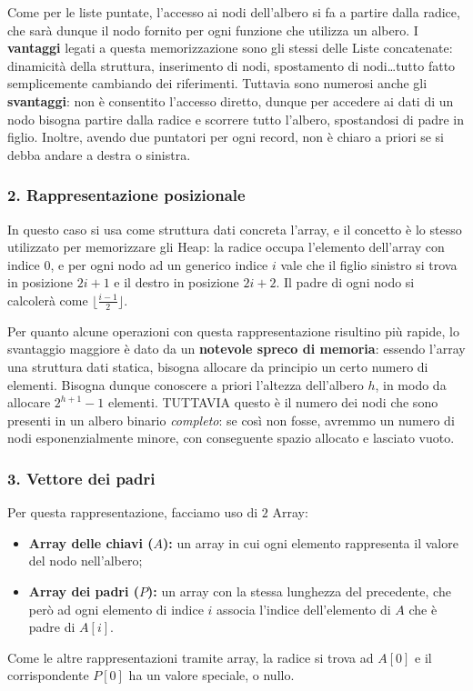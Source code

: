 \documentclass[12pt]{report}
\begin{document}
    Come per le liste puntate, l'accesso ai nodi dell'albero si fa a partire dalla radice, che sarà dunque il nodo fornito per ogni funzione che utilizza un albero.
    I \textbf{vantaggi} legati a questa memorizzazione sono gli stessi delle Liste concatenate: dinamicità della struttura, inserimento di nodi, spostamento di nodi\dots tutto fatto semplicemente cambiando dei riferimenti.
    Tuttavia sono numerosi anche gli \textbf{svantaggi}: non è consentito l'accesso diretto, dunque per accedere ai dati di un nodo bisogna partire dalla radice e scorrere tutto l'albero, spostandosi di padre in figlio. Inoltre, avendo due puntatori per ogni record, non è chiaro a priori se si debba andare a destra o sinistra.
    
    \subsubsection*{2. Rappresentazione posizionale}
    In questo caso si usa come struttura dati concreta l'array, e il concetto è lo stesso utilizzato per memorizzare gli Heap: la radice occupa l'elemento dell'array con indice $0$, e per ogni nodo ad un generico indice $i$ vale che il figlio sinistro si trova in posizione $2i+1$ e il destro in posizione $2i+2$. Il padre di ogni nodo si calcolerà come $\lfloor \frac{i-1}{2} \rfloor$.
    
    Per quanto alcune operazioni con questa rappresentazione risultino più rapide, lo svantaggio maggiore è dato da un \textbf{notevole spreco di memoria}: essendo l'array una struttura dati statica, bisogna allocare da principio un certo numero di elementi. Bisogna dunque conoscere a priori l'altezza dell'albero $h$, in modo da allocare $2^{h+1} - 1$ elementi. TUTTAVIA questo è il numero dei nodi che sono presenti in un albero binario \textit{completo}: se così non fosse, avremmo un numero di nodi esponenzialmente minore, con conseguente spazio allocato e lasciato vuoto.
    
    \newpage
    \subsubsection*{3. Vettore dei padri}
    Per questa rappresentazione, facciamo uso di $2$ Array:
    \begin{itemize}
    	\item \textbf{Array delle chiavi ($A$):} un array in cui ogni elemento rappresenta il valore del nodo nell'albero;
    	\item \textbf{Array dei padri ($P$):} un array con la stessa lunghezza del precedente, che però ad ogni elemento di indice $i$ associa l'indice dell'elemento di $A$ che è padre di $A[i]$.
    \end{itemize}
    Come le altre rappresentazioni tramite array, la radice si trova ad $A[0]$ e il corrispondente $P[0]$ ha un valore speciale, o nullo.
    
\end{document}
